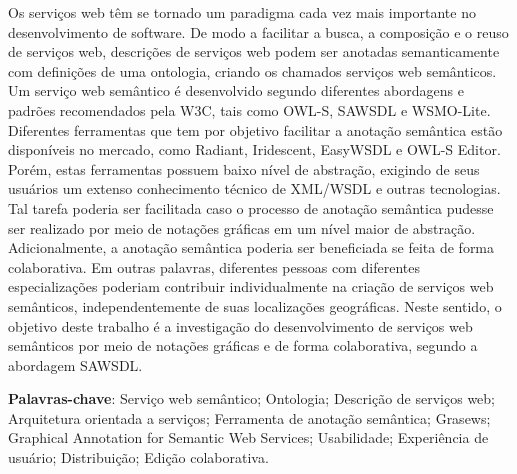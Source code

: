 \setlength{\absparsep}{18pt} %
\begin{resumo}
  Os serviços web têm se tornado um paradigma cada vez mais importante no desenvolvimento de software. De modo a facilitar a busca, a composição e o reuso de serviços web, descrições de serviços web podem ser anotadas semanticamente com definições de uma ontologia, criando os chamados serviços web semânticos. Um serviço web semântico é desenvolvido segundo diferentes abordagens e padrões recomendados pela W3C, tais como OWL-S, SAWSDL e WSMO-Lite. Diferentes ferramentas que tem por objetivo facilitar a anotação semântica estão disponíveis no mercado, como Radiant, Iridescent, EasyWSDL e OWL-S Editor. Porém, estas ferramentas possuem baixo nível de abstração, exigindo de seus usuários um extenso conhecimento técnico de XML/WSDL e outras tecnologias. Tal tarefa poderia ser facilitada caso o processo de anotação semântica pudesse ser realizado por meio de notações gráficas em um nível maior de abstração. Adicionalmente, a anotação semântica poderia ser beneficiada se feita de forma colaborativa. Em outras palavras, diferentes pessoas com diferentes especializações poderiam contribuir individualmente na criação de serviços web semânticos, independentemente de suas localizações geográficas. Neste sentido, o objetivo deste trabalho é a investigação do desenvolvimento de serviços web semânticos por meio de notações gráficas e de forma colaborativa, segundo a abordagem SAWSDL.

 \textbf{Palavras-chave}: Serviço web semântico; Ontologia; Descrição de serviços web; Arquitetura orientada a serviços; Ferramenta de anotação semântica; Grasews; Graphical Annotation for Semantic Web Services; Usabilidade; Experiência de usuário; Distribuição; Edição colaborativa.
\end{resumo}